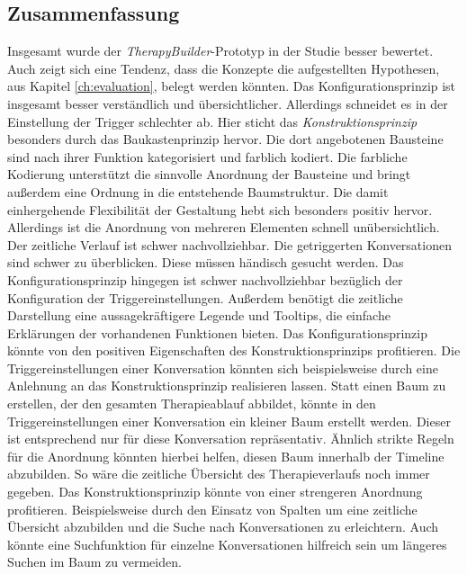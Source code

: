 \subsection{Zusammenfassung}
Insgesamt wurde der \emph{TherapyBuilder}-Prototyp in der Studie besser bewertet. Auch zeigt sich eine Tendenz, dass die Konzepte die aufgestellten Hypothesen, aus Kapitel \ref{ch:evaluation}, belegt werden könnten. Das Konfigurationsprinzip ist insgesamt besser verständlich und übersichtlicher. Allerdings schneidet es in der Einstellung der Trigger schlechter ab. Hier sticht das \emph{Konstruktionsprinzip} besonders durch das Baukastenprinzip hervor. Die dort angebotenen Bausteine sind nach ihrer Funktion kategorisiert und farblich kodiert. Die farbliche Kodierung unterstützt die sinnvolle Anordnung der Bausteine und bringt außerdem eine Ordnung in die entstehende Baumstruktur. Die damit einhergehende Flexibilität der Gestaltung hebt sich besonders positiv hervor. Allerdings ist die Anordnung von mehreren Elementen schnell unübersichtlich. Der zeitliche Verlauf ist schwer nachvollziehbar. Die getriggerten Konversationen sind schwer zu überblicken. Diese müssen händisch gesucht werden. Das Konfigurationsprinzip hingegen ist schwer nachvollziehbar bezüglich der Konfiguration der Triggereinstellungen. Außerdem benötigt die zeitliche Darstellung eine aussagekräftigere Legende und Tooltips, die einfache Erklärungen der vorhandenen Funktionen bieten. Das Konfigurationsprinzip könnte von den positiven Eigenschaften des Konstruktionsprinzips profitieren. Die Triggereinstellungen einer Konversation könnten sich beispielsweise durch eine Anlehnung an das Konstruktionsprinzip realisieren lassen. Statt einen Baum zu erstellen, der den gesamten Therapieablauf abbildet, könnte in den Triggereinstellungen einer Konversation ein kleiner Baum erstellt werden. Dieser ist entsprechend nur für diese Konversation repräsentativ. Ähnlich strikte Regeln für die Anordnung könnten hierbei helfen, diesen Baum innerhalb der Timeline abzubilden. So wäre die zeitliche Übersicht des Therapieverlaufs noch immer gegeben. Das Konstruktionsprinzip könnte von einer strengeren Anordnung profitieren. Beispielsweise durch den Einsatz von Spalten um eine zeitliche Übersicht abzubilden und die Suche nach Konversationen zu erleichtern. Auch könnte eine Suchfunktion für einzelne Konversationen hilfreich sein um längeres Suchen im Baum zu vermeiden.

